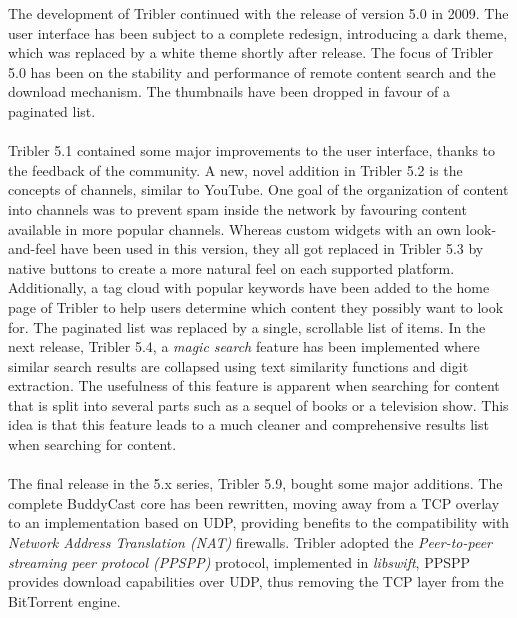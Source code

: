The development of Tribler continued with the release of version 5.0 in 2009\cite{historyoftribler}. The user interface has been subject to a complete redesign, introducing a dark theme, which was replaced by a white theme shortly after release. The focus of Tribler 5.0 has been on the stability and performance of remote content search and the download mechanism. The thumbnails have been dropped in favour of a paginated list.\\\\
Tribler 5.1 contained some major improvements to the user interface, thanks to the feedback of the community. A new, novel addition in Tribler 5.2 is the concepts of channels, similar to YouTube. One goal of the organization of content into channels was to prevent spam inside the network by favouring content available in more popular channels. Whereas custom widgets with an own look-and-feel have been used in this version, they all got replaced in Tribler 5.3 by native buttons to create a more natural feel on each supported platform. Additionally, a tag cloud with popular keywords have been added to the home page of Tribler to help users determine which content they possibly want to look for. The paginated list was replaced by a single, scrollable list of items. In the next release, Tribler 5.4, a \emph{magic search} feature has been implemented where similar search results are collapsed using text similarity functions and digit extraction. The usefulness of this feature is apparent when searching for content that is split into several parts such as a sequel of books or a television show. This idea is that this feature leads to a much cleaner and comprehensive results list when searching for content.\\\\
The final release in the 5.x series, Tribler 5.9, bought some major additions. The complete BuddyCast core has been rewritten, moving away from a TCP overlay to an implementation based on UDP, providing benefits to the compatibility with \emph{Network Address Translation (NAT)} firewalls. Tribler adopted the \emph{Peer-to-peer streaming peer protocol (PPSPP)} protocol\cite{bakker2015peer}, implemented in \emph{libswift}\cite{libswiftgithub}, PPSPP provides download capabilities over UDP, thus removing the TCP layer from the BitTorrent engine.\\\\
